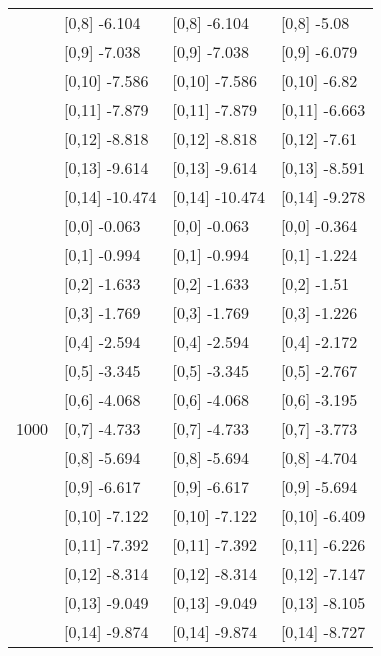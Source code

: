 \begin{table}
\begin{tabular}[t]{llll}
 & {}[0,8] -6.104 & {}[0,8] -6.104 & {}[0,8] -5.08\\
 & {}[0,9] -7.038 & {}[0,9] -7.038 & {}[0,9] -6.079\\
\addlinespace
 & {}[0,10] -7.586 & {}[0,10] -7.586 & {}[0,10] -6.82\\
 & {}[0,11] -7.879 & {}[0,11] -7.879 & {}[0,11] -6.663\\
 & {}[0,12] -8.818 & {}[0,12] -8.818 & {}[0,12] -7.61\\
 & {}[0,13] -9.614 & {}[0,13] -9.614 & {}[0,13] -8.591\\
 & {}[0,14] -10.474 & {}[0,14] -10.474 & {}[0,14] -9.278\\
\addlinespace
 & {}[0,0] -0.063 & {}[0,0] -0.063 & {}[0,0] -0.364\\
 & {}[0,1] -0.994 & {}[0,1] -0.994 & {}[0,1] -1.224\\
 & {}[0,2] -1.633 & {}[0,2] -1.633 & {}[0,2] -1.51\\
 & {}[0,3] -1.769 & {}[0,3] -1.769 & {}[0,3] -1.226\\
 & {}[0,4] -2.594 & {}[0,4] -2.594 & {}[0,4] -2.172\\
\addlinespace
 & {}[0,5] -3.345 & {}[0,5] -3.345 & {}[0,5] -2.767\\
 & {}[0,6] -4.068 & {}[0,6] -4.068 & {}[0,6] -3.195\\
1000 & {}[0,7] -4.733 & {}[0,7] -4.733 & {}[0,7] -3.773\\
 & {}[0,8] -5.694 & {}[0,8] -5.694 & {}[0,8] -4.704\\
 & {}[0,9] -6.617 & {}[0,9] -6.617 & {}[0,9] -5.694\\
\addlinespace
 & {}[0,10] -7.122 & {}[0,10] -7.122 & {}[0,10] -6.409\\
 & {}[0,11] -7.392 & {}[0,11] -7.392 & {}[0,11] -6.226\\
 & {}[0,12] -8.314 & {}[0,12] -8.314 & {}[0,12] -7.147\\
 & {}[0,13] -9.049 & {}[0,13] -9.049 & {}[0,13] -8.105\\
 & {}[0,14] -9.874 & {}[0,14] -9.874 & {}[0,14] -8.727\\
\bottomrule
\end{tabular}
\end{table}
